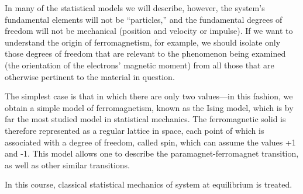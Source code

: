 \documentclass[9pt, a4paper, twoside, openright]{book}
\begin{document}
In many of the statistical models we will describe, however, the system's fundamental elements will not be “particles,” and the fundamental degrees of freedom will not be mechanical (position and velocity or impulse). If we want to understand the origin of ferromagnetism, for example, we should isolate only those degrees of freedom that are relevant to the phenomenon being examined (the orientation of the electrons’ magnetic moment) from all those that are otherwise pertinent to the material in question.

The simplest case is that in which there are only two values—in this fashion, we obtain a simple model of ferromagnetism, known as the Ising model, which is by far the most studied model in statistical mechanics. The ferromagnetic solid is therefore represented as a regular lattice in space, each point of which is associated with a degree of freedom, called spin, which can assume the values +1 and -1. This model allows one to describe the paramagnet-ferromagnet transition, as well as other similar transitions.

In this course, classical statistical mechanics of system at equilibrium is treated. 



\mainmatter
\pagestyle{fancy}















\end{document}
